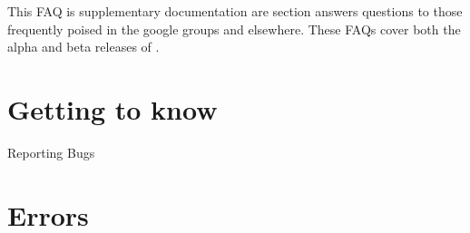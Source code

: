 This FAQ is supplementary documentation  are section answers questions to those frequently poised in the \poy google groups and elsewhere.
These FAQs cover both the alpha and beta releases of \poy.

\section{Getting to know \poy}
Reporting Bugs

\section{Errors}